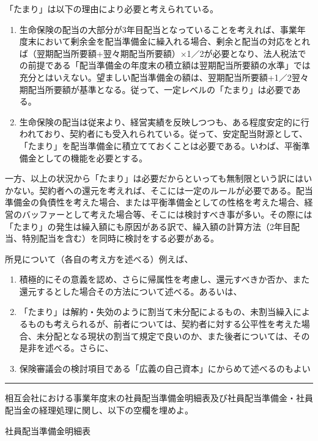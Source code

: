 \documentclass[report,gutter=10mm,fore-edge=10mm,uplatex,dvipdfmx]{jlreq}
\begin{document}
「たまり」は以下の理由により必要と考えられている。
\begin{enumerate}[ 1) ]
\item 生命保険の配当の大部分が3年目配当となっていることを考えれば、事業年度末において剰余金を配当準備金に繰入れる場合、剰余と配当の対応をとれば（翌期配当所要額+翌々期配当所要額）×1／2が必要となり、法人税法での前提である「配当準備金の年度末の積立額は翌期配当所要額の水準」では充分とはいえない。望ましい配当準備金の額は、翌期配当所要額+1／2翌々期配当所要額が基準となる。従って、一定レベルの「たまり」は必要である。
\item 生命保険の配当は従来より、経営実績を反映しつつも、ある程度安定的に行われており、契約者にも受入れられている。従って、安定配当財源として、「たまり」を配当準備金に積立てておくことは必要である。いわば、平衡準備金としての機能を必要とする。
\end{enumerate}

一方、以上の状況から「たまり」は必要だからといっても無制限という訳にはいかない。契約者への還元を考えれば、そこには一定のルールが必要である。配当準備金の負債性を考えた場合、または平衡準備金としての性格を考えた場合、経営のバッファーとして考えた場合等、そこには検討すべき事が多い。その際には「たまり」の発生は繰入額にも原因がある訳で、繰入額の計算方法（2年目配当、特別配当を含む）を同時に検討をする必要がある。

所見について（各自の考え方を述べる）例えば、
\begin{enumerate}
\item 積極的にその意義を認め、さらに帰属性を考慮し、還元すべきか否か、また還元するとした場合その方法について述べる。あるいは、
\item 「たまり」は解約・失効のように割当て未分配によるもの、未割当繰入によるものも考えられるが、前者については、契約者に対する公平性を考えた場合、未分配となる現状の割当て規定で良いのか、また後者については、その是非を述べる。さらに、
\item 保険審議会の検討項目である「広義の自己資本」にからめて述べるのもよい
\end{enumerate}

\begin{center}\rule{0.5\linewidth}{0.5pt}\end{center}


相互会社における事業年度末の社員配当準備金明細表及び社員配当準備金・社員配当金の経理処理に関し、以下の空欄を埋めよ。

社員配当準備金明細表
\end{document}

